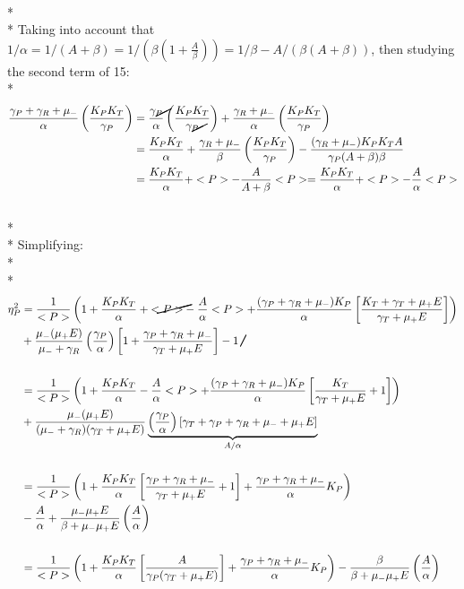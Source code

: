 \documentclass{article}
\begin{document}
\\*
\\*
Taking into account that $1/\alpha = 1/(A+\beta) = 1/(\beta(1+\frac{A}{\beta})) = 1/\beta - A/(\beta(A+\beta))$, then studying the second term of 15:
\\*
\begin{align*}
    \frac{\gamma_P + \gamma_R + \mu_-}{\alpha}\left(\frac{K_PK_T}{\gamma_P}\right) &= \frac{\cancel{\gamma_P}}{\alpha}\left(\frac{K_PK_T}{\cancel{\gamma_P}}\right) + \frac{\gamma_R + \mu_-}{\alpha}\left(\frac{K_PK_T}{\gamma_P}\right)\\
    &= \frac{K_PK_T}{\alpha} + \frac{\gamma_R + \mu_-}{\beta}\left(\frac{K_PK_T}{\gamma_P}\right) - \frac{(\gamma_R + \mu_-)K_PK_TA}{\gamma_P(A+\beta)\beta}\\
    &= \frac{K_PK_T}{\alpha} + <P> - \frac{A}{A+\beta}<P> =  \frac{K_PK_T}{\alpha} + <P> - \frac{A}{\alpha}<P>
\end{align*}
\\*
\\*
Simplifying:
\\*
\\*
\begin{align*}
    \eta_P^2 &= \frac{1}{<P>}\left( 1 + \frac{K_PK_T}{\alpha} + \cancel{<P>} - \frac{A}{\alpha}<P> + \frac{(\gamma_P + \gamma_R + \mu_-)K_P}{\alpha}\left[\frac{K_T + \gamma_T + \mu_+E}{\gamma_T + \mu_+E}\right] \right)\\
             &+ \frac{\mu_-(\mu_+E)}{\mu_- + \gamma_R}\left(\frac{\gamma_P}{\alpha}\right)\left[ 1 + \frac{\gamma_P + \gamma_R + \mu_-}{\gamma_T + \mu_+E}\right] - \cancel{1}\\
             \\
             &= \frac{1}{<P>}\left( 1 + \frac{K_PK_T}{\alpha} - \frac{A}{\alpha}<P> + \frac{(\gamma_P + \gamma_R + \mu_-)K_P}{\alpha}\left[\frac{K_T}{\gamma_T + \mu_+E} + 1 \right]\right)\\
             &+ \frac{\mu_-(\mu_+E)}{(\mu_- + \gamma_R)(\gamma_T + \mu_+E)}\underbrace{\left(\frac{\gamma_P}{\alpha}\right)\left[\gamma_T + \gamma_P + \gamma_R + \mu_- + \mu_+E\right]}_{A/\alpha}\\
             \\
             &= \frac{1}{<P>}\left( 1 + \frac{K_PK_T}{\alpha}\left[\frac{\gamma_P + \gamma_R + \mu_-}{\gamma_T + \mu_+E} + 1\right] + \frac{\gamma_P + \gamma_R + \mu_-}{\alpha}K_P\right)\\
             &- \frac{A}{\alpha} + \frac{\mu_-\mu_+E}{\beta + \mu_-\mu_+E}\left(\frac{A}{\alpha}\right)\\
             \\
             &= \frac{1}{<P>}\left( 1 + \frac{K_PK_T}{\alpha}\left[\frac{A}{\gamma_P(\gamma_T + \mu_+E)}\right] + \frac{\gamma_P + \gamma_R + \mu_-}{\alpha}K_P\right) - \frac{\beta}{\beta + \mu_-\mu_+E}\left(\frac{A}{\alpha}\right)
\end{align*}
\end{document}
